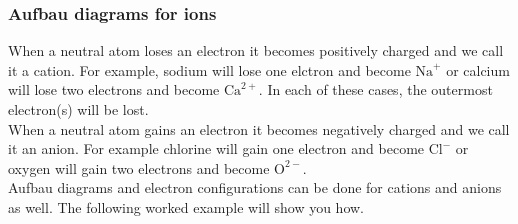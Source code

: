 \subsubsection*{Aufbau diagrams for ions}
When a neutral atom loses an electron it becomes positively charged and we call it a cation. For example, sodium will lose one elctron and become $\text{Na}^{+}$ or calcium will lose two electrons and become $\text{Ca}^{2+}$. In each of these cases, the outermost electron(s) will be lost. \\
When a neutral atom gains an electron it becomes negatively charged and we call it an anion. For example chlorine will gain one electron and become $\text{Cl}^{-}$ or oxygen will gain two electrons and become $\text{O}^{2-}$.  \\
Aufbau diagrams and electron configurations can be done for cations and anions as well. The following worked example will show you how. \\
